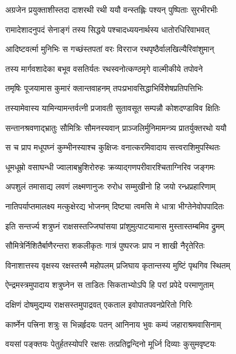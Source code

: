 \twolineshloka
{अग्रजेन प्रयुक्ताशीस्तदा दाशरथी रथी}
{ययौ वन्स्तह्लिः पश्यन् पुष्पिताः सुरभीरभीः} %

\twolineshloka
{रामादेशादनुपदं सेनाङ्गं तस्य सिद्धये}
{पश्चादध्ययनार्थस्य धातोरधिरिवाभवत्} %

\twolineshloka
{आदिष्टवर्त्मा मुनिभिः स गच्छंस्तपतां वरः}
{विरराज रथपृष्ठैर्वालखिल्यैरिवांशुमान्} %

\twolineshloka
{तस्य मार्गवशादेका बभूव वसतिर्यतः}
{रथस्वनोत्कण्ठमृगे वाल्मीकीये तपोवने} %

\twolineshloka
{तमृषिः पूजयामास कुमारं क्लान्तवाहनम्}
{तपःप्रभावसिद्धाभिर्विशेषप्रतिपत्तिभिः} %

\twolineshloka
{तस्यामेवास्य यामिन्यामन्तर्वत्नी प्रजावती}
{सुतावसूत सम्पन्नौ कोशदण्डाविव क्षितिः} %

\twolineshloka
{सन्तानश्रवणाद्भ्रातुः सौमित्रिः सौमनस्यवान्}
{प्राञ्जलिर्मुनिमामन्त्र्य प्रातर्युक्तरथो ययौ} %

\twolineshloka
{स च प्राप मधूपघ्नं कुम्भीनस्याश्च कुक्षिजः}
{वनात्करमिवादाय सत्त्वराशिमुपस्थितः} %

\twolineshloka
{धूमधूम्रो वसाघन्धी ज्वालाबभ्रुशिरोरुहः}
{क्रव्याद्गणपरीवारश्चिताग्निरिव जङ्गमः} %

\twolineshloka
{अपशुलं तमासाद्य लवणं लक्ष्मणानुजः}
{रुरोध सम्मुखीनो हि जयो रन्ध्रप्रहारिणाम्} %

\twolineshloka
{नातिपर्याप्तमालक्ष्य मत्कुक्षेरद्य भोजनम्}
{दिष्ट्या त्वमसि मे धात्रा भीग्तेनेवोपपादितः} %

\twolineshloka
{इति सन्तर्ज्य शत्रुघ्नं राक्षसस्तज्जिघांसया}
{प्रांशुमुत्पाटयामास मुस्तास्तम्बमिव द्रुमम्} %

\twolineshloka
{सौमित्रेर्निशितैर्बाणैरन्तरा शकलीकृतः}
{गात्रं पुष्परजः प्राप न शाखी नैरृतेरितः} %

\twolineshloka
{विनाशात्तस्य वृक्षस्य रक्षस्तस्मै महोपलम्}
{प्रजिघाय कृतान्तस्य मुष्टिं पृथगिव स्थितम्} %

\twolineshloka
{ऐन्द्रमस्त्रमुपादाय शत्रुघ्नेन स ताडितः}
{सिकताभ्योऽपि हि परां प्रपेदे परमाणुताम्} %

\twolineshloka
{दक्षिणं दोषमुद्यम्य राक्षसस्तमुपाद्रवत्}
{एकताल इवोपातपवनप्रेरितो गिरिः} %

\twolineshloka
{कार्ष्नेन पत्त्रिना शत्रुः स भिन्नर्हृदयः पतन्}
{आनिनाय भुवः कम्पं जहाराश्रमवासिनाम्} %

\twolineshloka
{वयसां पङ्क्तयः पेतुर्हतस्योपरि रक्षसः}
{तत्प्रतिद्वन्दिनो मूर्ध्नि दिव्याः कुसुमवृष्टयः} %

